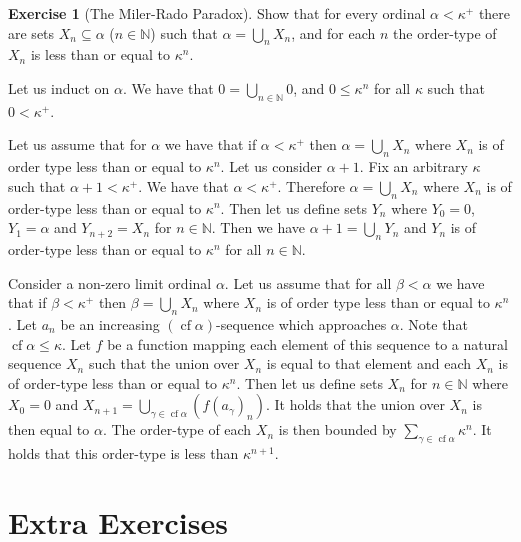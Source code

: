 \documentclass{article}
\theoremstyle{definition}
\newtheorem{exer}{Exercise}[section]
\newcommand{\N}{\mathbb{N}}
\DeclareMathOperator{\cf}{cf}
\newlength{\defparindent}
\newenvironment{answer}
    {\begin{mdframed}[backgroundcolor=gray!15, linewidth=0pt] \setlength{\parindent}{\defparindent}}
    {\end{mdframed}}
\begin{document}
\begin{exer}[The Miler-Rado Paradox]
    Show that for every ordinal $\alpha < \kappa^+$ there are sets $X_n \subseteq \alpha$ ($n \in \N$) such that $\alpha = \bigcup_n X_n$, and for each $n$ the order-type of $X_n$ is less than or equal to $\kappa^n$.
    \begin{answer}
        Let us induct on $\alpha$. We have that $0 = \bigcup_{n \in \N} 0$, and $0 \le \kappa^n$ for all $\kappa$ such that $0 < \kappa^+$. 
        
        Let us assume that for $\alpha$ we have that if $\alpha < \kappa^+$ then $\alpha = \bigcup_n X_n$ where $X_n$ is of order type less than or equal to $\kappa^n$. Let us consider $\alpha + 1$. Fix an arbitrary $\kappa$ such that $\alpha + 1 < \kappa^+$. We have that $\alpha < \kappa^+$. Therefore $\alpha = \bigcup_n X_n$ where $X_n$ is of order-type less than or equal to $\kappa^n$. Then let us define sets $Y_n$ where $Y_0 = 0$, $Y_1 = \alpha$ and $Y_{n + 2} = X_n$ for $n \in \N$. Then we have $\alpha + 1 = \bigcup_n Y_n$ and $Y_n$ is of order-type less than or equal to $\kappa^n$ for all $n \in \N$.

        Consider a non-zero limit ordinal $\alpha$. Let us assume that for all $\beta < \alpha$ we have that if $\beta < \kappa^+$ then $\beta = \bigcup_n X_n$ where $X_n$ is of order type less than or equal to $\kappa^n$. Let $a_n$ be an increasing $(\cf \alpha)$-sequence which approaches $\alpha$. Note that $\cf \alpha \le \kappa$. Let $f$ be a function mapping each element of this sequence to a natural sequence $X_n$ such that the union over $X_n$ is equal to that element and each $X_n$ is of order-type less than or equal to $\kappa^n$. Then let us define sets $X_n$ for $n \in \N$ where $X_0 = 0$ and $X_{n + 1} = \bigcup_{\gamma \in \cf \alpha} (f(a_\gamma)_n)$. It holds that the union over $X_n$ is then equal to $\alpha$. The order-type of each $X_n$ is then bounded by $\sum_{\gamma \in \cf \alpha} \kappa^n$. It holds that this order-type is less than $\kappa^{n + 1}$. 
    \end{answer}
\end{exer}

\section{Extra Exercises}
\end{document}
